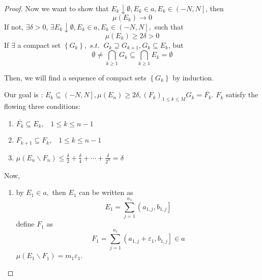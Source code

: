 \begin{proof}
	Now we want to show that $ {E_k} \downarrow \emptyset ,{E_k} \in a,{E_k} \in \left( { - N,N} \right] $, then
	\begin{equation}
	\mu \left( {{E_k}} \right) \to 0
	\label{eq7.2}
	\end{equation}
	If not, $\exists \delta  > 0$,  $\exists {E_k} \downarrow \emptyset ,{E_k} \in a,{E_k} \in \left( { - N,N} \right],$ such that
	\begin{equation}
	\mu \left( {{E_k}} \right) \geqslant 2\delta  > 0
	\label{eq7.3}
	\end{equation}
    If $ \exists $ a compact set $\left\{ {{G_k}} \right\},\; s.t. \; \; {G_k} \supseteq {G_{k + 1}},{G_k} \subseteq {E_k}$, but
	\begin{equation}
	\emptyset  \ne \bigcap\limits_{k \geqslant 1} {{G_k}}  \subseteq \bigcap\limits_{k \geqslant 1} {{E_k}}  = \emptyset 
	\label{eq7.4}
	\end{equation}
	
	Then, we will find a sequence of compact sets $\left\{ {{G_k}} \right\}$ by induction.
	
	Our goal is : ${E_k} \subseteq \left( { - N,N} \right],\mu \left( {{E_n}} \right) \geqslant 2\delta ,{\left( {{F_k}} \right)_{1 \leqslant k \leqslant M}} {G_k} = \overline {{F_k}} .$ ${F_k}$ satisfy the flowing three conditions:
	\begin{enumerate}
		\item $\overline {{F_k}}  \subseteq {E_k},\;\;\;1 \leqslant k \leqslant n-1$
		\item ${F_{k + 1}} \subseteq {F_k},\;\;\;1 \leqslant k \leqslant n - 1$
		\item $\mu \left( {{E_n}\backslash {F_n}} \right) \leqslant \frac{\delta }{2} + \frac{\delta }{4} +  \cdots  + \frac{\delta }{{{2^n}}} = \delta $
	\end{enumerate}
	Now,
	\begin{enumerate}
		\item by $ E_{1} \in a, $ then ${E_1}$ can be written as
		\begin{equation}
		{E_1} = \sum\limits_{j = 1}^{{n_1}} {\left( {{a_{1,j}},{b_{1,j}}} \right]} 
		\label{eq7.5}
		\end{equation}
		define $ F_{1} $ as 
		\begin{equation}
		{F_1} = \sum\limits_{j = 1}^{{n_1}} {\left( {{a_{1,j}} + {\varepsilon _1},{b_{1,j}}} \right]}  \in a
		\end{equation}
		$\mu \left( {{E_1}\backslash {F_1}} \right) = {m_1}{\varepsilon _1}$.
		

\end{enumerate}
\end{proof}
